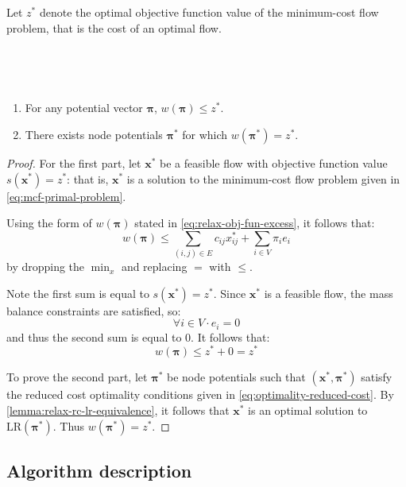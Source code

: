 \begin{defn}
Let $z^*$ denote the optimal objective function value of the minimum-cost flow problem, that is the cost of an optimal flow.
\end{defn}
~ %
\begin{lemma} \label{lemma:relax-dual-optimality}
~ %
\begin{enumerate}[label=(\alph*)]
    \item For any potential vector $\boldsymbol{\pi}$, $w(\boldsymbol{\pi}) \leq z^*$.
    \item There exists node potentials $\boldsymbol{\pi}^*$ for which $w(\boldsymbol{\pi}^*) = z^*$.
\end{enumerate}
\end{lemma}
\begin{proof}
For the first part, let $\mathbf{x}^*$ be a feasible flow with objective function value $s(\mathbf{x}^*) = z^*$: that is, $\mathbf{x}^*$ is a solution to the minimum-cost flow problem given in \cref{eq:mcf-primal-problem}.

Using the form of $w(\boldsymbol{\pi})$ stated in \cref{eq:relax-obj-fun-excess}, it follows that:
\[w(\boldsymbol{\pi})\leq\sum_{\left(i,j\right)\in E}c_{ij}x_{ij}^{*}+\sum_{i\in V}\pi_{i}e_{i}\]
by dropping the $\min_x$ and replacing $=$ with $\leq$.

Note the first sum is equal to $s(\mathbf{x}^*) = z^*$. Since $\mathbf{x}^*$ is a feasible flow, the mass balance constraints are satisfied, so:
\[\forall i \in V\cdot e_i = 0\]
and thus the second sum is equal to $0$. It follows that:
\[w(\boldsymbol{\pi}) \leq z^* + 0 = z^*\]

To prove the second part, let $\boldsymbol{\pi}^*$ be node potentials such that $\left(\mathbf{x}^*,\boldsymbol{\pi}^*\right)$ satisfy the reduced cost optimality conditions given in \cref{eq:optimality-reduced-cost}\footnotemark. By \cref{lemma:relax-rc-lr-equivalence}, it follows that $\mathbf{x}^*$ is an optimal solution to $\mathrm{LR}(\boldsymbol{\pi}^*)$. Thus $w(\boldsymbol{\pi}^*) = z^*$.
\end{proof}


\subsection{Algorithm description}

